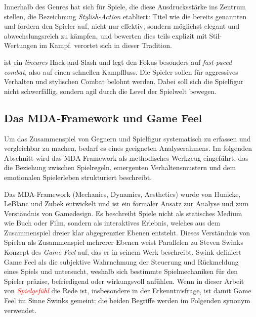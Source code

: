 \documentclass[../Main.tex]{subfiles}
\begin{document}
Innerhalb des Genres hat sich für Spiele, die diese Ausdrucksstärke ins Zentrum stellen, die Bezeichnung \textit{Stylish-Action} etabliert: Titel wie die bereits genannten  und  fordern den Spieler auf, nicht nur effektiv, sondern möglichst elegant und abwechslungsreich zu kämpfen, und bewerten dies teils explizit mit Stil-Wertungen im Kampf.  verortet sich in dieser Tradition.

 ist ein \textit{lineares} Hack-and-Slash und legt den Fokus besonders auf \textit{fast-paced combat}, also auf einen schnellen Kampffluss. Die Spieler sollen für aggressives Verhalten und stylischen Combat belohnt werden. Dabei soll sich die Spielfigur nicht schwerfällig, sondern agil durch die Level der Spielwelt bewegen.

\subsection{Das MDA-Framework und Game Feel}
Um das Zusammenspiel von Gegnern und Spielfigur systematisch zu erfassen und vergleichbar zu machen, bedarf es eines geeigneten Analyserahmens. Im folgenden Abschnitt wird das MDA-Framework als methodisches Werkzeug eingeführt, das die Beziehung zwischen Spielregeln, emergenten Verhaltensmustern und dem emotionalen Spielerleben strukturiert beschreibt.

Das MDA-Framework (Mechanics, Dynamics, Aesthetics) wurde von Hunicke, LeBlanc und Zubek entwickelt und ist ein formaler Ansatz zur Analyse und zum Verständnis von Gamedesign. Es beschreibt Spiele nicht als statisches Medium wie Buch oder Film, sondern als interaktives Erlebnis, welches aus dem Zusammenspiel dreier klar abgegrenzter Ebenen entsteht. Dieses Verständnis von Spielen als Zusammenspiel mehrerer Ebenen weist Parallelen zu Steven Swinks Konzept des \textit{Game Feel} auf, das er in seinem Werk  beschreibt. Swink definiert Game Feel als die subjektive Wahrnehmung der Steuerung und Rückmeldung eines Spiels und untersucht, weshalb sich bestimmte Spielmechaniken für den Spieler präzise, befriedigend oder wirkungsvoll anfühlen.\autocite[s.1-s.6]{swink2008gamefeel} Wenn in dieser Arbeit von \textit{\textcolor{red}{Spielgefühl}} die Rede ist, insbesondere in der Erkenntnisfrage, ist damit Game Feel im Sinne Swinks gemeint; die beiden Begriffe werden im Folgenden synonym verwendet.
\end{document}
